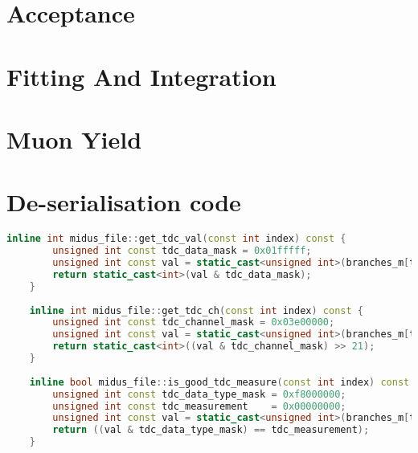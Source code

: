 \documentclass[]{article}
\begin{document}
\section{Acceptance} %
\label{sec:acceptance}

\section{Fitting And Integration} %
\label{sec:fitting_and_integration}

\section{Muon Yield} %
\label{sec:muon_yield}

\appendix
\section{De-serialisation code} %
\label{app:deserialisation}

\begin{center}
	\begin{lstlisting}[caption={Functions used for de-serialising CAEN V1290N \ref{REF FOR THE DATA SHEET} MTDC  output, written in C++}, language=C++, float=htbp]
    inline int midus_file::get_tdc_val(const int index) const {
        unsigned int const tdc_data_mask = 0x01fffff;
        unsigned int const val = static_cast<unsigned int>(branches_m[tdc_i].data[index]);
        return static_cast<int>(val & tdc_data_mask);
    }
    
    inline int midus_file::get_tdc_ch(const int index) const {
        unsigned int const tdc_channel_mask = 0x03e00000;
        unsigned int const val = static_cast<unsigned int>(branches_m[tdc_i].data[index]);
        return static_cast<int>((val & tdc_channel_mask) >> 21);
    }
    
    inline bool midus_file::is_good_tdc_measure(const int index) const {
        unsigned int const tdc_data_type_mask = 0xf8000000;
        unsigned int const tdc_measurement    = 0x00000000;
        unsigned int const val = static_cast<unsigned int>(branches_m[tdc_i].data[index]);
        return ((val & tdc_data_type_mask) == tdc_measurement);
    }
	\end{lstlisting}
\end{center}
\end{document}
